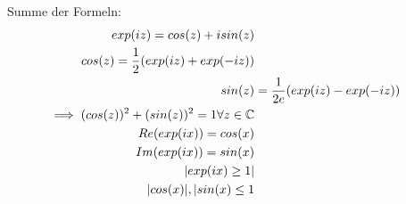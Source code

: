 Summe der Formeln:
\begin{equation}
 \begin{split}
exp(iz) = cos(z) + i sin(z) \\
cos(z) = \frac{1}{2} (exp(iz) + exp(-iz))\\
sin(z) &= \frac{1}{2e} (exp(iz) - exp(-iz))\\
\implies (cos(z))^2 + (sin(z))^2 = 1 \forall z \in \mathbb{C} \\
Re(exp(ix)) = cos(x) \\
Im(exp(ix)) = sin(x) \\
|exp(ix) \ge 1| \\
|cos(x)| , |sin(x) \le 1
 \end{split}
\end{equation}







